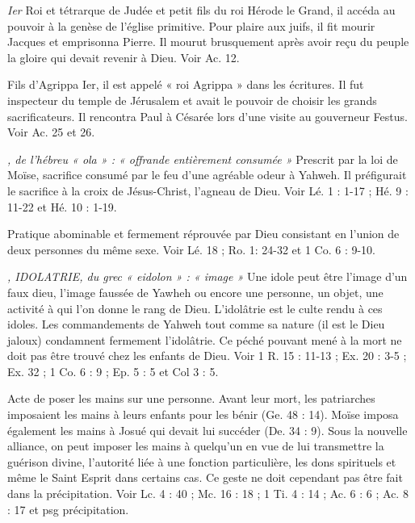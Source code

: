 \begin{multicols}{2}
\textit{Ier}\newline
Roi et tétrarque de Judée et petit fils du roi Hérode le Grand, il accéda au pouvoir à la genèse de l’église primitive. Pour plaire aux juifs, il fit mourir Jacques et emprisonna Pierre. Il mourut brusquement après avoir reçu du peuple la gloire qui devait revenir à Dieu. Voir Ac. 12.

\textit{}\newline
Fils d’Agrippa Ier, il est appelé « roi Agrippa » dans les écritures. Il fut inspecteur du temple de Jérusalem et avait le pouvoir de choisir les grands sacrificateurs. Il rencontra Paul à Césarée lors d’une visite au gouverneur Festus. Voir Ac. 25 et 26.

\textit{, de l’hébreu « ola » : « offrande entièrement consumée »}\newline
Prescrit par la loi de Moïse, sacrifice consumé par le feu d'une agréable odeur à Yahweh. Il préfigurait le sacrifice à la croix de Jésus-Christ, l’agneau de Dieu. Voir Lé. 1 : 1-17 ; Hé. 9 : 11-22 et Hé. 10 : 1-19.

\textit{}\newline
Pratique abominable et fermement réprouvée par Dieu consistant en l’union de deux personnes du même sexe. Voir Lé. 18 ; Ro. 1: 24-32 et 1 Co. 6 : 9-10.

\textit{, IDOLATRIE, du grec « eidolon » : « image »}\newline
Une idole peut être l’image d’un faux dieu, l’image faussée de Yawheh ou encore une personne, un objet, une activité à qui l’on donne le rang de Dieu. L’idolâtrie est le culte rendu à ces idoles.
Les commandements de Yahweh tout comme sa nature (il est le Dieu jaloux) condamnent fermement l’idolâtrie. Ce péché pouvant mené à la mort ne doit pas être trouvé chez les enfants de Dieu. Voir 1 R. 15 : 11-13 ; Ex. 20 : 3-5 ; Ex. 32 ; 1 Co. 6 : 9 ; Ep. 5 : 5 et Col 3 : 5.

\textit{}\newline
Acte de poser les mains sur une personne. Avant leur mort, les patriarches imposaient les mains à leurs enfants pour les bénir (Ge. 48 : 14). Moïse imposa également les mains à Josué qui devait lui succéder (De. 34 : 9). Sous la nouvelle alliance, on peut imposer les mains à quelqu’un en vue de lui transmettre la guérison divine, l’autorité liée à une fonction particulière, les dons spirituels et même le Saint Esprit dans certains cas. Ce geste ne doit cependant pas être fait dans la précipitation. Voir Lc. 4 : 40 ; Mc. 16 : 18 ; 1 Ti. 4 : 14 ; Ac. 6 : 6 ; Ac. 8 : 17 et psg précipitation.


\end{multicols}
